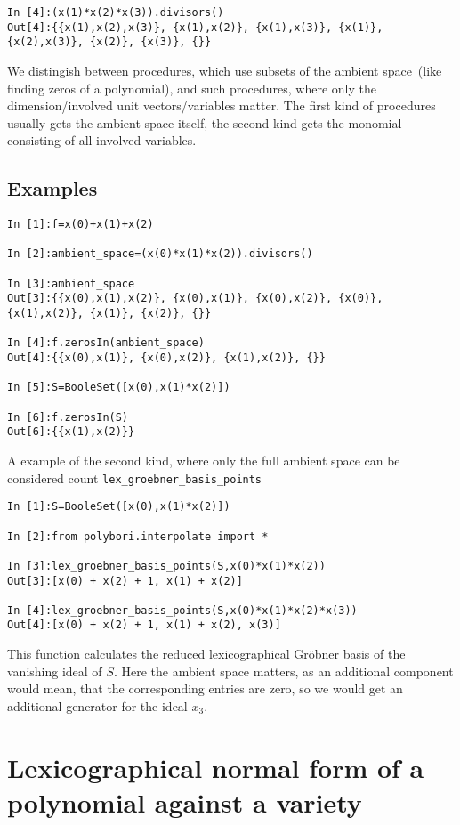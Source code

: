 \documentclass[]{article}
\newcommand{\Groebner}{Gr\"{o}bner\xspace}
\begin{document}
\begin{lstlisting}
In [4]:(x(1)*x(2)*x(3)).divisors()
Out[4]:{{x(1),x(2),x(3)}, {x(1),x(2)}, {x(1),x(3)}, {x(1)}, {x(2),x(3)}, {x(2)}, {x(3)}, {}}
\end{lstlisting}

We distingish between procedures, which use subsets of the ambient space~(like
finding zeros of a polynomial),  and such procedures, where
only the dimension/involved unit vectors/variables matter.
The first kind of procedures usually gets the ambient space itself, the second kind gets the monomial consisting of all involved variables.

\subsection{Examples}
\begin{lstlisting}
In [1]:f=x(0)+x(1)+x(2)

In [2]:ambient_space=(x(0)*x(1)*x(2)).divisors()

In [3]:ambient_space
Out[3]:{{x(0),x(1),x(2)}, {x(0),x(1)}, {x(0),x(2)}, {x(0)}, {x(1),x(2)}, {x(1)}, {x(2)}, {}}

In [4]:f.zerosIn(ambient_space)
Out[4]:{{x(0),x(1)}, {x(0),x(2)}, {x(1),x(2)}, {}}

In [5]:S=BooleSet([x(0),x(1)*x(2)])

In [6]:f.zerosIn(S)
Out[6]:{{x(1),x(2)}}
\end{lstlisting}

A example of the second kind, where only the full ambient space can be considered count \lstinline|lex_groebner_basis_points|
\begin{lstlisting}
In [1]:S=BooleSet([x(0),x(1)*x(2)])

In [2]:from polybori.interpolate import *              

In [3]:lex_groebner_basis_points(S,x(0)*x(1)*x(2))
Out[3]:[x(0) + x(2) + 1, x(1) + x(2)]

In [4]:lex_groebner_basis_points(S,x(0)*x(1)*x(2)*x(3))
Out[4]:[x(0) + x(2) + 1, x(1) + x(2), x(3)]
\end{lstlisting}

This function calculates the reduced lexicographical \Groebner basis of the vanishing ideal of $S$.
Here the ambient space matters, as an additional component would mean, that the corresponding entries are zero, so we would get an additional generator for the ideal $x_3$.

\section{Lexicographical normal form of a polynomial against a variety}
\end{document}
